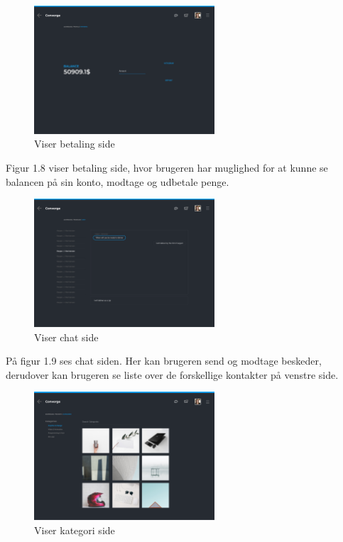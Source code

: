 \newpage
\begin{figure}[ht]
    \centering
\includegraphics[width=0.6\textwidth]{system-interface-pdf/Payments.pdf}
\caption{Viser betaling side}
\label{fig:figure2}
\end{figure}

Figur 1.8 viser betaling side, hvor brugeren har muglighed for at kunne se balancen på sin konto, modtage og udbetale penge. 

\begin{figure}[ht]
    \centering
\includegraphics[width=0.6\textwidth]{system-interface-pdf/Text-chat.pdf}
\caption{Viser chat side}
\label{fig:figure2}
\end{figure}

På figur 1.9 ses chat siden. Her kan brugeren send og modtage beskeder, derudover kan brugeren se liste over de forskellige kontakter på venstre side. 

\begin{figure}[ht]
    \centering
\includegraphics[width=0.6\textwidth]{system-interface-pdf/Categories.pdf}
\caption{Viser kategori side}
\label{fig:figure2}
\end{figure}

